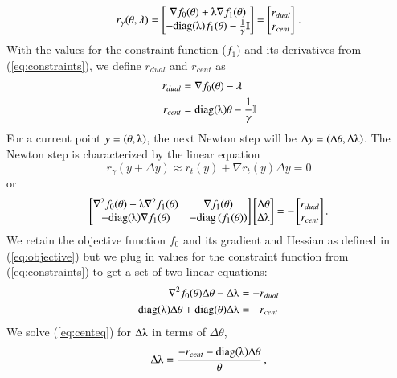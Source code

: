 \documentclass[11pt]{article}
\begin{document}
\[r_\gamma(\theta, \lambda) = \begin{bmatrix}
\nabla f_0(\theta) + \lambdaup\nabla f_1(\theta)\\
-\text{diag}(\lambdaup)f_1(\theta) - \frac{1}{\gamma}\mathbb{I}
\end{bmatrix} = \begin{bmatrix}
r_{dual}\\r_{cent}
\end{bmatrix}\,.\]
With the values for the constraint function ($f_1$) and its derivatives from (\ref{eq:constraints}), we define  $r_{dual}$ and $r_{cent}$ as 
\begin{align}
r_{dual}&= \nabla f_0(\theta) - \lambda\label{eq:rdual}\\
r_{cent}&= \text{diag}(\lambdaup)\theta - \frac{1}{\gamma}\mathbb{I}
\end{align}
For a current point $y = \left(\theta, \lambdaup\right)$, the next Newton step will be $\Delta y = \left(\Delta\theta, \Delta\lambdaup\right)$. The Newton step is characterized by the linear equation
\[r_\gamma(y + \Delta y) \approx r_t(y) + \nabla r_t(y)\Delta y = 0\] or 
\[\begin{bmatrix}
\nabla^2f_0(\theta) + \lambdaup\nabla^2f_1(\theta)&\nabla f_1(\theta)\\
-\text{diag}(\lambdaup)\nabla f_1(\theta)&-\text{diag}\left(f_1(\theta)\right)
\end{bmatrix}\begin{bmatrix}
\Delta\theta \\ \Delta\lambdaup
\end{bmatrix} = - \begin{bmatrix}
r_{dual}\\r_{cent}
\end{bmatrix}.\]
We retain the objective function $f_0$ and its gradient and Hessian as defined in (\ref{eq:objective}) but we plug in values for the constraint function from (\ref{eq:constraints}) to get a set of two linear equations:
\begin{align}
\nabla^2f_0(\theta)\Delta\theta - \Delta\lambdaup &= -r_{dual}\label{eq:dualeq}\\
\text{diag}(\lambdaup)\Delta\theta + \text{diag}(\theta)\Delta\lambdaup &= -r_{cent}\,\label{eq:centeq}
\end{align}
We solve (\ref{eq:centeq}) for $\Delta\lambdaup$ in terms of $\Delta\theta$,
\begin{equation}
\Delta\lambdaup = \frac{-r_{cent} - \text{diag}(\lambdaup)\Delta\theta}{\theta}\, ,\label{eq:dellam}
\end{equation}
\end{document}
